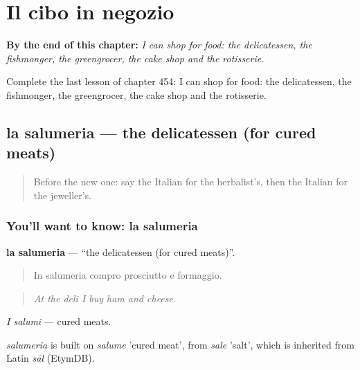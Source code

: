
\chapter{Il cibo in negozio}
\label{ch:it-il-cibo-in-negozio}

\begin{chapteropening}
\textbf{By the end of this chapter:} \emph{I can shop for food: the delicatessen, the fishmonger, the greengrocer, the cake shop and the rotisserie.}

Complete the last lesson of chapter 454: I can shop for food: the delicatessen, the fishmonger, the greengrocer, the cake shop and the rotisserie.
\end{chapteropening}

\section[la salumeria]{la salumeria — the delicatessen (for cured meats)}

\label{lesson:IT-C454-salumeria}



\begin{quote}
Before the new one: say the Italian for the herbalist's, then the Italian for the jeweller's.
\end{quote}

\subsection*{You'll want to know: la salumeria}
\textbf{la salumeria} — \textquotedblleft{}the delicatessen (for cured meats)\textquotedblright{}.

\begin{quote}
In salumeria compro prosciutto e formaggio.
\end{quote}

\begin{quote}
\emph{At the deli I buy ham and cheese.}
\end{quote}

\emph{I salumi} — cured meats.

\begin{cousinweb}
\emph{salumeria} is built on \emph{salume} 'cured meat', from \emph{sale} 'salt', which is inherited from Latin \emph{sāl} (EtymDB).
\end{cousinweb}

